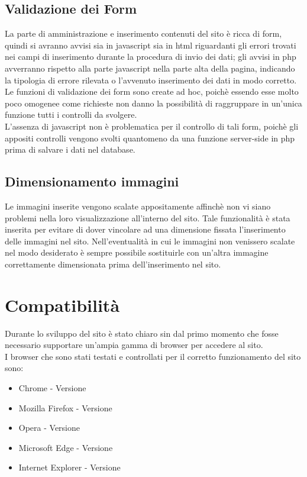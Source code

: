 \documentclass[a4paper,12pt]{article}
\begin{document}
\subsection{Validazione dei Form}
La parte di amministrazione e inserimento contenuti del sito è ricca di form, quindi si avranno avvisi sia in javascript sia in html riguardanti gli errori trovati nei campi di inserimento durante la procedura di invio dei dati; gli avvisi in php avverranno rispetto alla parte javascript nella parte alta della pagina, indicando la tipologia di errore rilevata o l'avvenuto inserimento dei dati in modo corretto.\\
Le funzioni di validazione dei form sono create ad hoc, poichè essendo esse molto poco omogenee come richieste non danno la possibilità di raggruppare in un'unica funzione tutti i controlli da svolgere.\\
L'assenza di javascript non è problematica per il controllo di tali form, poichè gli appositi controlli vengono svolti quantomeno da una funzione server-side in php prima di salvare i dati nel database.\\
\subsection{Dimensionamento immagini}
Le immagini inserite vengono scalate appositamente affinchè non vi siano problemi nella loro visualizzazione all'interno del sito. Tale funzionalità è stata inserita per evitare di dover vincolare ad una dimensione fissata l'inserimento delle immagini nel sito. Nell'eventualità in cui le immagini non venissero scalate nel modo desiderato è sempre possibile sostituirle con un'altra immagine correttamente dimensionata prima dell'inserimento nel sito.

\section{Compatibilità}
Durante lo sviluppo del sito è stato chiaro sin dal primo momento che fosse necessario supportare un'ampia gamma di browser per accedere al sito.
\\I browser che sono stati testati e controllati per il corretto funzionamento del sito sono:
\begin{itemize}
	\item Chrome - Versione
	\item Mozilla Firefox - Versione
	\item Opera - Versione
	\item Microsoft Edge - Versione
	\item Internet Explorer - Versione
\end{itemize}
\end{document}
